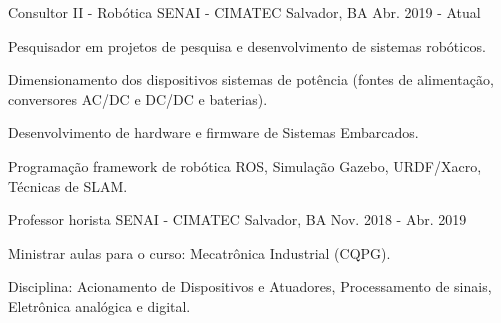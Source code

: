 

\begin{cventries}

  \cventry
    {Consultor II - Robótica} %
    {SENAI - CIMATEC} %
    {Salvador, BA} %
    {Abr. 2019 - Atual} %
    {
      \begin{cvitems} %
        \item {Pesquisador em projetos de pesquisa e desenvolvimento de sistemas robóticos.}
        \item {Dimensionamento dos dispositivos sistemas de potência (fontes de alimentação, conversores AC/DC e DC/DC e baterias).}
        \item {Desenvolvimento de hardware e firmware de Sistemas Embarcados.}
        \item {Programação framework de robótica ROS, Simulação Gazebo, URDF/Xacro, Técnicas de SLAM.}
      \end{cvitems}
    }

  \cventry
    {Professor horista} %
    {SENAI - CIMATEC} %
    {Salvador, BA} %
    {Nov. 2018 - Abr. 2019} %
    {
      \begin{cvitems} %
        \item {Ministrar aulas para o curso: Mecatrônica Industrial (CQPG).}
        \item {Disciplina: Acionamento de Dispositivos e Atuadores, Processamento de sinais, Eletrônica analógica e digital.}
      \end{cvitems}
    }

    

\end{cventries}
